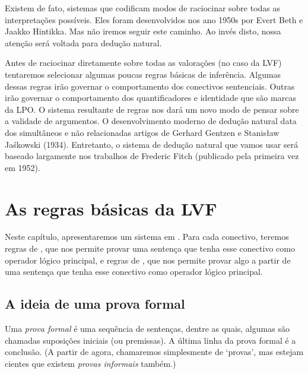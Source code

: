 Existem de fato, sistemas que  codificam modos de raciocinar sobre todas as interpreta\c c\~oes poss\'iveis. Eles foram desenvolvidos nos ano 1950s por Evert Beth e  Jaakko Hintikka.  Mas n\~ao iremos seguir este caminho.  Ao inv\'es disto,  nossa aten\c c\~ao ser\'a voltada para dedu\c c\~ao natural. 
 
Antes de raciocinar diretamente sobre todas as valora\c c\~oes  (no caso da LVF) tentaremos selecionar algumas poucas regras b\'asicas de infer\^encia.  Algumas dessas regras  ir\~ao governar o comportamento dos conectivos sentenciais. Outras ir\~ao governar o comportamento dos quantificadores e identidade que s\~ao marcas da LPO.  
O sistema resultante de regras nos dar\'a um novo modo de pensar sobre a validade de argumentos.  O desenvolvimento moderno de dedu\c c\~ao  natural data dos simult\^aneos  e n\~ao relacionadas artigos de  
 Gerhard Gentzen e Stanis\l{}aw Ja\'{s}kowski (1934).  Entretanto, o sistema de dedu\c c\~ao natural que vamos usar  ser\'a  baseado largamente nos trabalhos de Frederic Fitch (publicado pela primeira vez em 1952). 

\chapter{As regras b\'asicas da LVF}\label{s:BasicTFL}

 

Neste cap\'itulo,  apresentaremos um sistema em  . Para cada conectivo, teremos regras de  ,  que nos permite provar uma senten\c ca que tenha esse conectivo como operador l\'ogico principal, e regras de , que nos permite provar  algo a partir de  uma senten\c ca que tenha esse  conectivo como operador l\'ogico principal. 


\section{A  ideia de uma prova formal}
Uma \emph{prova formal} \'e uma sequ\^encia de senten\c cas,  dentre as quais, algumas s\~ao  chamadas suposi\c c\~oes iniciais (ou premissas).  A \'ultima linha da prova formal \'e a conclus\~ao.  (A partir de agora, chamaremos simplesmente de `provas',  mas estejam cientes que existem \emph{provas informais} tamb\'em.)

